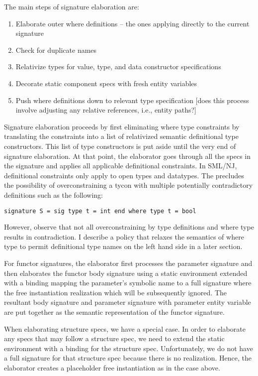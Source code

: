 The main steps of signature elaboration are:
\begin{enumerate}
        \item Elaborate outer where definitions -- the ones applying directly to the current signature
        \item Check for duplicate names
	\item Relativize types for value, type, and data constructor specifications
	\item Decorate static component specs with fresh entity variables 
        \item Push where definitions down to relevant type specification [does this process involve adjusting any relative references, i.e., entity paths?]
\end{enumerate}

Signature elaboration proceeds by first eliminating where type constraints by translating the constraints into a list of relativized semantic definitional type constructors. This list of type constructors is put aside until the very end of signature elaboration. At that point, the elaborator goes through all the specs in the signature and applies all applicable definitional constraints. In SML/NJ, definitional constraints only apply to open types and datatypes. The precludes the possibility of overconstraining a tycon with multiple potentially contradictory definitions such as the following:

\begin{lstlisting}
signature S = sig type t = int end where type t = bool
\end{lstlisting}

However, observe that not all overconstraining by type definitions and where type results in contradiction. I describe a policy that relaxes the semantics of where type to permit definitional type names on the left hand side in a later section. 

For functor signatures, the elaborator first processes the parameter signature and then elaborates the functor body signature using a static environment extended with a binding mapping the parameter's symbolic name to a full signature where the free instantiation realization which will be subsequently ignored. The resultant body signature and parameter signature with parameter entity variable are put together as the semantic representation of the functor signature. 

When elaborating structure specs, we have a special case. In order to elaborate any specs that may follow a structure spec, we need to extend the static environment with a binding for the structure spec. Unfortunately, we do not have a full signature for that structure spec because there is no realization. Hence, the elaborator creates a placeholder free instantiation as in the case above.  

